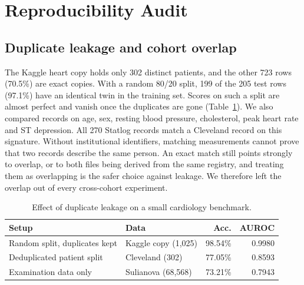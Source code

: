 \documentclass[conference]{IEEEtran}
\begin{document}
\section{Reproducibility Audit}\label{sec:audit}
\subsection{Duplicate leakage and cohort overlap}
The Kaggle heart copy holds only 302 distinct patients, and the other 723 rows (70.5\%) are exact copies. With a random 80/20 split, 199 of the 205 test rows (97.1\%) have an identical twin in the training set. Scores on such a split are almost perfect and vanish once the duplicates are gone (Table~\ref{tab:leak}). We also compared records on age, sex, resting blood pressure, cholesterol, peak heart rate and ST depression. All 270 Statlog records match a Cleveland record on this signature. Without institutional identifiers, matching measurements cannot prove that two records describe the same person. An exact match still points strongly to overlap, or to both files being derived from the same registry, and treating them as overlapping is the safer choice against leakage. We therefore left the overlap out of every cross-cohort experiment.

\begin{table}[t]
\caption{Effect of duplicate leakage on a small cardiology benchmark.}
\label{tab:leak}
\centering\footnotesize
\begin{tabular}{p{2.6cm}p{2.3cm}rr}
\toprule
Setup & Data & Acc. & AUROC\\
\midrule
Random split, duplicates kept & Kaggle copy (1{,}025) & 98.54\% & 0.9980\\
Deduplicated patient split & Cleveland (302) & 77.05\% & 0.8593\\
Examination data only & Sulianova (68{,}568) & 73.21\% & 0.7943\\
\bottomrule
\end{tabular}
\end{table}
\end{document}
